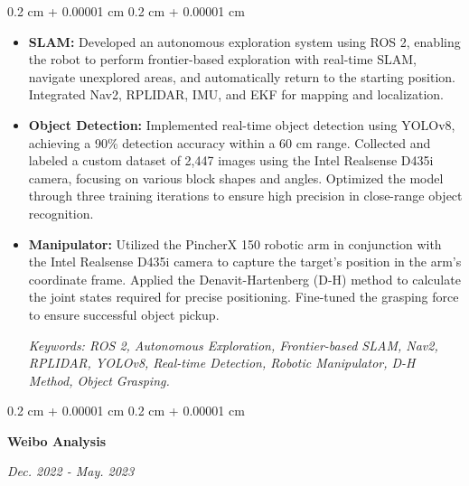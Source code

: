\documentclass[10pt, letterpaper]{article}
\newenvironment{highlights}{
    \begin{itemize}[
        topsep=0.10 cm,
        parsep=0.10 cm,
        partopsep=0pt,
        itemsep=0pt,
        leftmargin=0.4 cm + 10pt
    ]
}{
    \end{itemize}
} %
\newenvironment{onecolentry}{
    \begin{adjustwidth}{
        0.2 cm + 0.00001 cm
    }{
        0.2 cm + 0.00001 cm
    }
}{
    \end{adjustwidth}
} %
\newenvironment{twocolentry}[2][]{
    \onecolentry
    \def\secondColumn{#2}
    \setcolumnwidth{\fill, 6 cm}
    \begin{paracol}{2}
}{
    \switchcolumn \raggedleft \secondColumn
    \end{paracol}
    \endonecolentry
} %
\begin{document}
        \vspace{0.10 cm}
        \begin{onecolentry}
            \begin{highlights}
                \item \textbf{SLAM:} Developed an autonomous exploration system using ROS 2, enabling the robot to perform frontier-based exploration with real-time SLAM, navigate unexplored areas, and automatically return to the starting position. Integrated Nav2, RPLIDAR, IMU, and EKF for mapping and localization. 
                \item \textbf{Object Detection:} Implemented real-time object detection using YOLOv8, achieving a 90\% detection accuracy within a 60 cm range. Collected and labeled a custom dataset of 2,447 images using the Intel Realsense D435i camera, focusing on various block shapes and angles. Optimized the model through three training iterations to ensure high precision in close-range object recognition. 
                \item \textbf{Manipulator:} Utilized the PincherX 150 robotic arm in conjunction with the Intel Realsense D435i camera to capture the target's position in the arm's coordinate frame. Applied the Denavit-Hartenberg (D-H) method to calculate the joint states required for precise positioning. Fine-tuned the grasping force to ensure successful object pickup. \par
                \textit{Keywords: ROS 2, Autonomous Exploration, Frontier-based SLAM, Nav2, RPLIDAR, YOLOv8, Real-time Detection, Robotic Manipulator, D-H Method, Object Grasping.}
            \end{highlights}
        \end{onecolentry}

        
        \vspace{0.2 cm}
        
       \begin{twocolentry}{
       \textit{Dec. 2022 - May. 2023}
    }
    \textbf{Weibo Analysis}
    \end{twocolentry}
    
\end{document}
